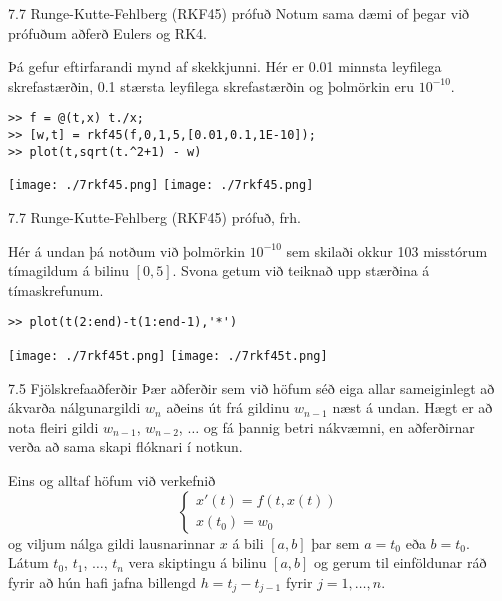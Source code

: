 \begin{frame}[fragile]{7.7 Runge-Kutte-Fehlberg (RKF45) prófuð}
Notum sama dæmi of þegar við prófuðum aðferð Eulers og RK4.

Þá gefur eftirfarandi mynd af skekkjunni.
Hér er 0.01 minnsta leyfilega skrefastærðin, 0.1 stærsta leyfilega skrefastærðin
og þolmörkin eru $10^{-10}$. 
\begin{verbatim}
>> f = @(t,x) t./x;
>> [w,t] = rkf45(f,0,1,5,[0.01,0.1,1E-10]);
>> plot(t,sqrt(t.^2+1) - w)
\end{verbatim}
{\texttt{[image: ./7rkf45.png]}}
{\texttt{[image: ./7rkf45.png]}}
\end{frame}

\begin{frame}[fragile]{7.7 Runge-Kutte-Fehlberg (RKF45) prófuð, frh.}

Hér á undan þá notðum við þolmörkin $10^{-10}$ sem skilaði okkur 103 misstórum tímagildum
á bilinu $[0,5]$.
Svona getum við teiknað upp stærðina á tímaskrefunum.
\begin{verbatim}
>> plot(t(2:end)-t(1:end-1),'*')
\end{verbatim}
{\texttt{[image: ./7rkf45t.png]}}
{\texttt{[image: ./7rkf45t.png]}}
\end{frame}



% 
% 
% 


\begin{frame}{7.5 Fjölskrefaaðferðir} 
Þær aðferðir sem við höfum séð eiga allar sameiginlegt að ákvarða
nálgunargildi $w_{n}$ aðeins út frá gildinu $w_{n-1}$ næst á undan. Hægt
er að nota fleiri gildi $w_{n-1}$, $w_{n-2}$, $\ldots$ og fá þannig betri
nákvæmni, en aðferðirnar verða að sama skapi flóknari í notkun. 

\pause
\smallskip
Eins og alltaf höfum við verkefnið 
\begin{equation*}
  \left\{
    \begin{array}{l}
      x'(t) = f(t,x(t)) \\
      x(t_0) = w_0
    \end{array}
  \right.
\end{equation*}
og viljum nálga gildi lausnarinnar $x$ á bili $[a,b]$ þar sem $a =
t_0$ eða $b = t_0$. Látum $t_0$, $t_1$, $\ldots$, $t_n$ vera skiptingu
á bilinu $[a,b]$ og gerum til einföldunar ráð fyrir að hún hafi jafna
billengd $h=t_{j} - t_{j-1}$ fyrir $j= 1, \ldots, n$. 
\end{frame}


